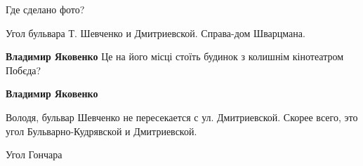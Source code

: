  
 
 
 
 

Где сделано фото?

Угол бульвара Т. Шевченко и Дмитриевской. Справа-дом Шварцмана.

\textbf{Владимир Яковенко} Це на його місці стоїть будинок з колишнім кінотеатром Побєда?

\textbf{Владимир Яковенко} 

Володя, бульвар Шевченко не пересекается с ул. Дмитриевской. Скорее всего, это
угол Бульварно-Кудрявской и Дмитриевской.

Угол Гончара
